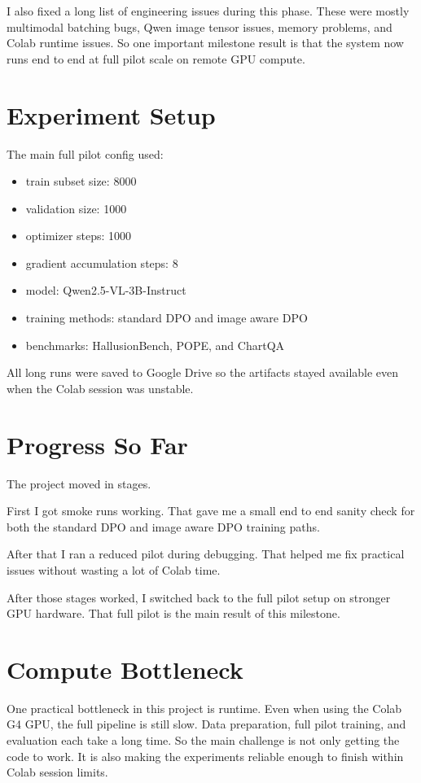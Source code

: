 \documentclass[11pt]{article}
\begin{document}
I also fixed a long list of engineering issues during this phase.
These were mostly multimodal batching bugs, Qwen image tensor issues, memory problems, and Colab runtime issues.
So one important milestone result is that the system now runs end to end at full pilot scale on remote GPU compute.

\section*{Experiment Setup}
The main full pilot config used:

\begin{itemize}
    \item train subset size: 8000
    \item validation size: 1000
    \item optimizer steps: 1000
    \item gradient accumulation steps: 8
    \item model: Qwen2.5-VL-3B-Instruct
    \item training methods: standard DPO and image aware DPO
    \item benchmarks: HallusionBench, POPE, and ChartQA
\end{itemize}

All long runs were saved to Google Drive so the artifacts stayed available even when the Colab session was unstable.

\section*{Progress So Far}
The project moved in stages.

First I got smoke runs working.
That gave me a small end to end sanity check for both the standard DPO and image aware DPO training paths.

After that I ran a reduced pilot during debugging.
That helped me fix practical issues without wasting a lot of Colab time.

After those stages worked, I switched back to the full pilot setup on stronger GPU hardware.
That full pilot is the main result of this milestone.

\section*{Compute Bottleneck}
One practical bottleneck in this project is runtime.
Even when using the Colab G4 GPU, the full pipeline is still slow.
Data preparation, full pilot training, and evaluation each take a long time.
So the main challenge is not only getting the code to work.
It is also making the experiments reliable enough to finish within Colab session limits.
\end{document}
